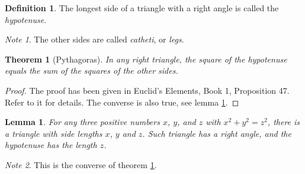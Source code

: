 \documentclass{article}
\newtheorem{thm}{Theorem}
\newtheorem{lem}{Lemma}
\theoremstyle{definition}
\newtheorem{dfn}{Definition}
\theoremstyle{remark}
\newtheorem{note}{Note}
\begin{document}
\begin{dfn}
  The longest side of a triangle with a right angle
  is called the \emph{hypotenuse}.
\end{dfn}
\begin{note}
  The other sides are called \emph{catheti},
  or \emph{legs}.
\end{note}
\begin{thm}[Pythagoras]
  \label{pythagoras}
  In any right triangle, the square of the hypotenuse
  equals the sum of the squares of the other sides.
\end{thm}
\begin{proof}
  The proof has been given in Euclid's Elements,
  Book 1, Proposition 47. Refer to it for details.
  The converse is also true, see lemma \ref{converse}.
\end{proof}
\begin{lem}
  \label{converse}
  For any three positive numbers \(x\), \(y\),
  and \(z\) with \(x^2 + y^2 = z^2\), there is a
  triangle with side lengths \(x\), \(y\) and \(z\).
  Such triangle has a right angle, and the hypotenuse
  has the length \(z\).
\end{lem}
\begin{note}
  This is the converse of theorem \ref{pythagoras}.
\end{note}
\end{document}
